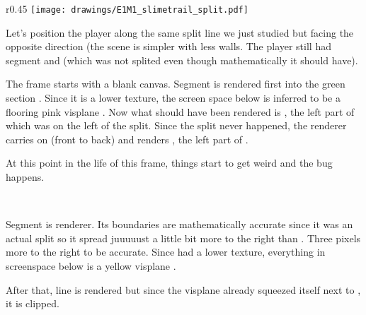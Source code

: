\begin{minipage}{0.47\textwidth}
\end{minipage}
\hspace{4mm}
\begin{minipage}{0.47\textwidth}
\end{minipage} 
\par
\vspace{1mm}
\par



\par
\begin{wrapfigure}[23]{r}{0.45\textwidth}
\centering
\texttt{[image: drawings/E1M1\_slimetrail\_split.pdf]}
\end{wrapfigure}
Let's position the player along the same split line we just studied but facing the opposite direction (the scene is simpler with less walls. The player still had segment  and  (which was not splited even though mathematically it should have).\\
\par
The frame starts with a blank canvas. Segment  is rendered first into the green section . Since it is a lower texture, the screen space below is inferred to be a flooring pink visplane . Now what should have been rendered is , the left part of  which was on the left of the split. Since the split never happened, the renderer carries on (front to back) and renders , the left part of .\\
\par
At this point in the life of this frame, things start to get weird and the bug happens.
 

\\
\par
Segment  is renderer. Its boundaries are mathematically accurate since it was an actual split so it spread juuuuust a little bit more to the right than  . Three pixels more to the right to be accurate. Since  had a lower texture, everything in screenspace below  is a yellow visplane .\\
 \par
 After that, line  is rendered but since the visplane already squeezed itself next to , it is clipped.\\
 \par
 
